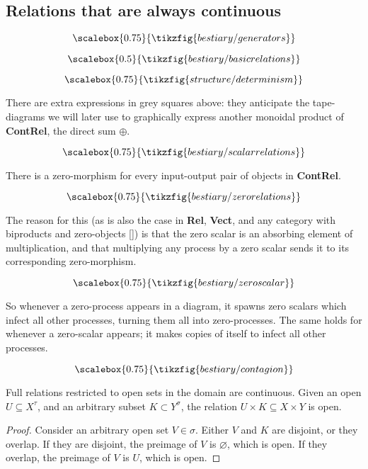 \subsection{Relations that are always continuous}


\[\scalebox{0.75}{\tikzfig{bestiary/generators}}\]


\[\scalebox{0.5}{\tikzfig{bestiary/basicrelations}}\]


\[\scalebox{0.75}{\tikzfig{structure/determinism}}\]

 There are extra expressions in grey squares above: they anticipate the tape-diagrams we will later use to graphically express another monoidal product of \textbf{ContRel}, the direct sum $\oplus$.

\[\scalebox{0.75}{\tikzfig{bestiary/scalarrelations}}\]

 There is a zero-morphism for every input-output pair of objects in \textbf{ContRel}. 

\[\scalebox{0.75}{\tikzfig{bestiary/zerorelations}}\]

The reason for this (as is also the case in \textbf{Rel}, \textbf{Vect}, and any category with biproducts and zero-objects []) is that the zero scalar is an absorbing element of multiplication, and that multiplying any process by a zero scalar sends it to its corresponding zero-morphism.

\[\scalebox{0.75}{\tikzfig{bestiary/zeroscalar}}\]

So whenever a zero-process appears in a diagram, it spawns zero scalars which infect all other processes, turning them all into zero-processes. The same holds for whenever a zero-scalar appears; it makes copies of itself to infect all other processes.

\[\scalebox{0.75}{\tikzfig{bestiary/contagion}}\]

\clearpage

\begin{proposition}\label{prop:bowtie}
Full relations restricted to open sets in the domain are continuous. Given an open $U \subseteq X^\tau$, and an arbitrary subset $K \subset Y^\sigma$, the relation $U \times K \subseteq X \times Y$ is open.
\begin{proof}
Consider an arbitrary open set $V \in \sigma$. Either $V$ and $K$ are disjoint, or they overlap. If they are disjoint, the preimage of $V$ is $\varnothing$, which is open. If they overlap, the preimage of $V$ is $U$, which is open.
\end{proof}
\end{proposition}



